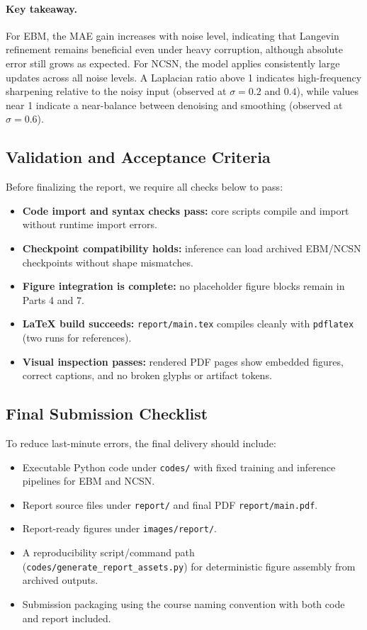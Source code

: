 \paragraph{Key takeaway.}
For EBM, the MAE gain increases with noise level, indicating that Langevin
refinement remains beneficial even under heavy corruption, although absolute
error still grows as expected. For NCSN, the model applies consistently large
updates across all noise levels. A Laplacian ratio above 1 indicates
high-frequency sharpening relative to the noisy input (observed at
$\sigma=0.2$ and $0.4$), while values near 1 indicate a near-balance between
denoising and smoothing (observed at $\sigma=0.6$).

\subsection{Validation and Acceptance Criteria}

Before finalizing the report, we require all checks below to pass:
\begin{itemize}[leftmargin=*]
  \item \textbf{Code import and syntax checks pass:} core scripts compile and
  import without runtime import errors.
  \item \textbf{Checkpoint compatibility holds:} inference can load archived
  EBM/NCSN checkpoints without shape mismatches.
  \item \textbf{Figure integration is complete:} no placeholder figure blocks
  remain in Parts 4 and 7.
  \item \textbf{LaTeX build succeeds:} \texttt{report/main.tex} compiles
  cleanly with \texttt{pdflatex} (two runs for references).
  \item \textbf{Visual inspection passes:} rendered PDF pages show embedded
  figures, correct captions, and no broken glyphs or artifact tokens.
\end{itemize}

\subsection{Final Submission Checklist}

To reduce last-minute errors, the final delivery should include:
\begin{itemize}[leftmargin=*]
  \item Executable Python code under \texttt{codes/} with fixed training and
  inference pipelines for EBM and NCSN.
  \item Report source files under \texttt{report/} and final PDF
  \texttt{report/main.pdf}.
  \item Report-ready figures under \texttt{images/report/}.
  \item A reproducibility script/command path
  (\texttt{codes/generate\_report\_assets.py}) for deterministic figure
  assembly from archived outputs.
  \item Submission packaging using the course naming convention with both code
  and report included.
\end{itemize}

